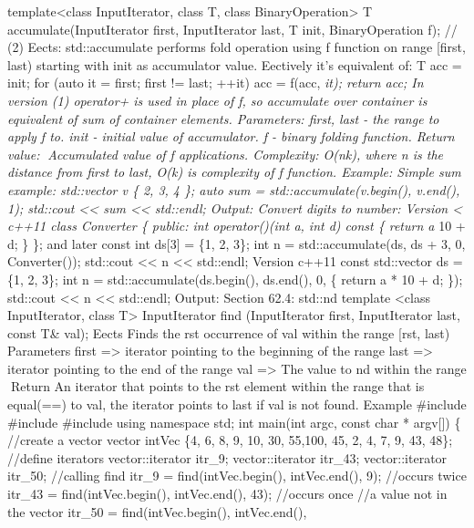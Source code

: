 template\textless class InputIterator, class T, class
BinaryOperation\textgreater{} T accumulate(InputIterator first,
InputIterator last, T init, BinaryOperation f); // (2) Eects:
std::accumulate performs fold operation using f function on range
{[}first, last) starting with init as accumulator value. Eectively it's
equivalent of: T acc = init; for (auto it = first; first != last; ++it)
acc = f(acc, \emph{it); return acc; In version (1) operator+ is used in
place of f, so accumulate over container is equivalent of sum of
container elements. Parameters: first, last - the range to apply f to.
init - initial value of accumulator. f - binary folding function. Return
value: Accumulated value of f applications. Complexity: O(nk), where n
is the distance from first to last, O(k) is complexity of f function.
Example: Simple sum example: std::vector v \{ 2, 3, 4 \}; auto sum =
std::accumulate(v.begin(), v.end(), 1); std::cout \textless\textless{}
sum \textless\textless{} std::endl; Output: Convert digits to number:
Version \textless{} c++11 class Converter \{ public: int operator()(int
a, int d) const \{ return a } 10 + d; \} \}; and later const int
ds{[}3{]} = \{1, 2, 3\}; int n = std::accumulate(ds, ds + 3, 0,
Converter()); std::cout \textless\textless{} n \textless\textless{}
std::endl; Version c++11 const std::vector ds = \{1, 2, 3\}; int n =
std::accumulate(ds.begin(), ds.end(), 0, \href{int\%20a,\%20int\%20d}{}
\{ return a * 10 + d; \}); std::cout \textless\textless{} n
\textless\textless{} std::endl; Output: Section 62.4: std::nd template
\textless class InputIterator, class T\textgreater{} InputIterator find
(InputIterator first, InputIterator last, const T\& val); Eects Finds
the rst occurrence of val within the range {[}rst, last) Parameters
first =\textgreater{} iterator pointing to the beginning of the range
last =\textgreater{} iterator pointing to the end of the range val
=\textgreater{} The value to nd within the range Return An iterator
that points to the rst element within the range that is equal(==) to
val, the iterator points to last if val is not found. Example \#include
\#include \#include using namespace std; int main(int argc, const char *
argv{[}{]}) \{ //create a vector vector intVec \{4, 6, 8, 9, 10, 30,
55,100, 45, 2, 4, 7, 9, 43, 48\}; //define iterators vector::iterator
itr\_9; vector::iterator itr\_43; vector::iterator itr\_50; //calling
find itr\_9 = find(intVec.begin(), intVec.end(), 9); //occurs twice
itr\_43 = find(intVec.begin(), intVec.end(), 43); //occurs once //a
value not in the vector itr\_50 = find(intVec.begin(), intVec.end(),
